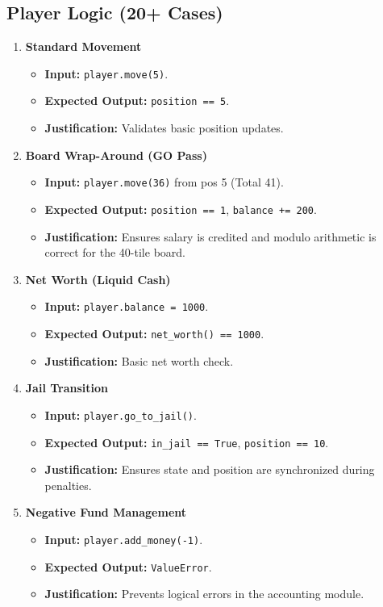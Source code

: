 \documentclass{article}
\begin{document}
\subsection{Player Logic (20+ Cases)}
\begin{enumerate}
    \item \textbf{Standard Movement}
    \begin{itemize}
        \item \textbf{Input:} \texttt{player.move(5)}.
        \item \textbf{Expected Output:} \texttt{position == 5}.
        \item \textbf{Justification:} Validates basic position updates.
    \end{itemize}

    \item \textbf{Board Wrap-Around (GO Pass)}
    \begin{itemize}
        \item \textbf{Input:} \texttt{player.move(36)} from pos 5 (Total 41).
        \item \textbf{Expected Output:} \texttt{position == 1}, \texttt{balance += 200}.
        \item \textbf{Justification:} Ensures salary is credited and modulo arithmetic is correct for the 40-tile board.
    \end{itemize}

    \item \textbf{Net Worth (Liquid Cash)}
    \begin{itemize}
        \item \textbf{Input:} \texttt{player.balance = 1000}.
        \item \textbf{Expected Output:} \texttt{net_worth() == 1000}.
        \item \textbf{Justification:} Basic net worth check.
    \end{itemize}

    \item \textbf{Jail Transition}
    \begin{itemize}
        \item \textbf{Input:} \texttt{player.go_to_jail()}.
        \item \textbf{Expected Output:} \texttt{in_jail == True}, \texttt{position == 10}.
        \item \textbf{Justification:} Ensures state and position are synchronized during penalties.
    \end{itemize}

    \item \textbf{Negative Fund Management}
    \begin{itemize}
        \item \textbf{Input:} \texttt{player.add_money(-1)}.
        \item \textbf{Expected Output:} \texttt{ValueError}.
        \item \textbf{Justification:} Prevents logical errors in the accounting module.
    \end{itemize}
\end{enumerate}
\end{document}
